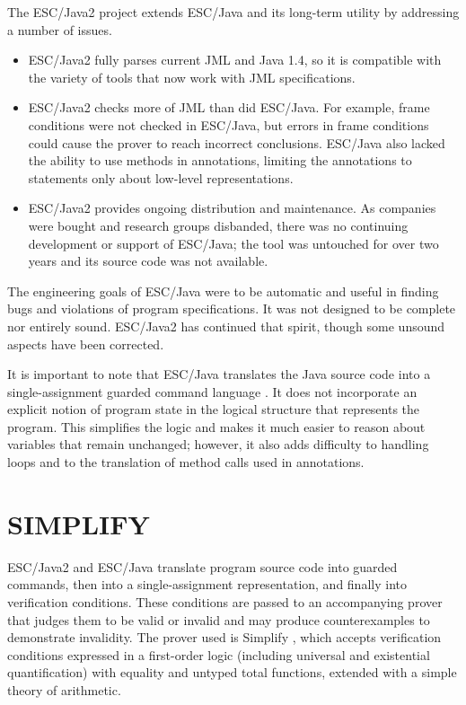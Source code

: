 \documentclass{sig-alternate2}
\begin{document}
The ESC/Java2 project extends ESC/Java
and its long-term utility by addressing a number of issues.
\setlength{\partopsep}{0in}\setlength{\parskip}{0in}\setlength{\itemsep}{0in}\setlength{\topsep}{0in}
\begin{itemize}
\setlength{\partopsep}{0in}\setlength{\parskip}{0in}\setlength{\itemsep}{0in}\setlength{\topsep}{0in}

\item ESC/Java2 fully parses current JML and Java 1.4, so it is
compatible with the variety of tools that now work with JML specifications.

\item ESC/Java2 checks more of JML than did ESC/Java.
For example, frame conditions were not checked in ESC/Java, but errors in frame
conditions could cause the prover to reach incorrect conclusions.
ESC/Java also lacked the ability to use methods in
annotations, limiting the annotations to statements only about
low-level representations.

\item ESC/Java2 provides ongoing distribution and maintenance.
As companies were bought and research groups
disbanded, there was no continuing development or support of 
ESC/Java; the tool was untouched for over two years and its
source code was not available. 

\end{itemize}

The engineering goals of ESC/Java were to be automatic and useful in finding bugs
and violations of program specifications.  It was not designed to be complete nor
entirely sound.  ESC/Java2 has continued that spirit, though some unsound aspects have
been corrected.

It is important to note that ESC/Java translates the Java source code into a 
single-assignment guarded command language \cite{escDesignNotes}.  It does not incorporate 
an explicit notion of program state in the logical structure that represents the program.
This simplifies the logic and makes it much easier to reason about variables that remain
unchanged; however, it also adds difficulty to handling loops and to the translation of method calls 
used in annotations.

\section{SIMPLIFY}

ESC/Java2 and ESC/Java translate program source code into guarded commands, then into a single-assignment representation, and 
finally
into verification conditions.  These conditions are passed to an accompanying prover that
judges them to be valid or invalid and may produce counterexamples to demonstrate
invalidity.  The prover used is
Simplify \cite{nelson80,simplify}, which accepts verification conditions expressed in a
first-order logic (including universal and existential quantification) with equality and untyped total
functions, extended with a simple theory of arithmetic.
\end{document}
